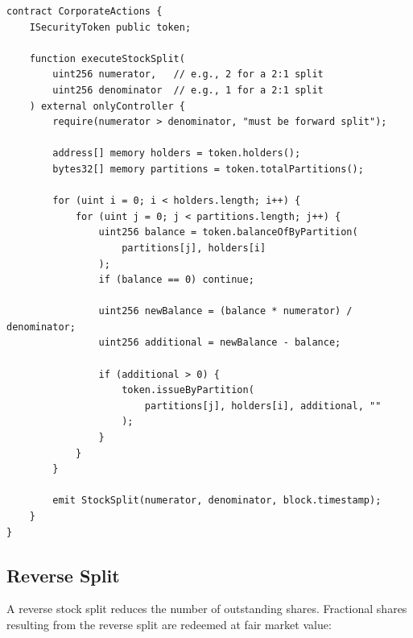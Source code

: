 \documentclass[11pt,a4paper]{article}
\begin{document}
\begin{lstlisting}[language=Solidity,caption={Stock split implementation.}]
contract CorporateActions {
    ISecurityToken public token;

    function executeStockSplit(
        uint256 numerator,   // e.g., 2 for a 2:1 split
        uint256 denominator  // e.g., 1 for a 2:1 split
    ) external onlyController {
        require(numerator > denominator, "must be forward split");

        address[] memory holders = token.holders();
        bytes32[] memory partitions = token.totalPartitions();

        for (uint i = 0; i < holders.length; i++) {
            for (uint j = 0; j < partitions.length; j++) {
                uint256 balance = token.balanceOfByPartition(
                    partitions[j], holders[i]
                );
                if (balance == 0) continue;

                uint256 newBalance = (balance * numerator) / denominator;
                uint256 additional = newBalance - balance;

                if (additional > 0) {
                    token.issueByPartition(
                        partitions[j], holders[i], additional, ""
                    );
                }
            }
        }

        emit StockSplit(numerator, denominator, block.timestamp);
    }
}
\end{lstlisting}

\subsection{Reverse Split}

A reverse stock split reduces the number of outstanding shares. Fractional shares resulting from the reverse split are redeemed at fair market value:
\end{document}

